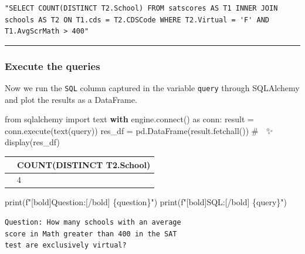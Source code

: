 \documentclass[
  letterpaper,
  DIV=11,
  numbers=noendperiod]{scrartcl}
\newenvironment{Shaded}{\begin{snugshade}}{\end{snugshade}}
\newcommand{\BuiltInTok}[1]{\textcolor[rgb]{0.00,0.23,0.31}{#1}}
\newcommand{\CommentTok}[1]{\textcolor[rgb]{0.37,0.37,0.37}{#1}}
\newcommand{\ControlFlowTok}[1]{\textcolor[rgb]{0.00,0.23,0.31}{\textbf{#1}}}
\newcommand{\ExtensionTok}[1]{\textcolor[rgb]{0.00,0.23,0.31}{#1}}
\newcommand{\ImportTok}[1]{\textcolor[rgb]{0.00,0.46,0.62}{#1}}
\newcommand{\NormalTok}[1]{\textcolor[rgb]{0.00,0.23,0.31}{#1}}
\newcommand{\OperatorTok}[1]{\textcolor[rgb]{0.37,0.37,0.37}{#1}}
\newcommand{\SpecialCharTok}[1]{\textcolor[rgb]{0.37,0.37,0.37}{#1}}
\newcommand{\SpecialStringTok}[1]{\textcolor[rgb]{0.13,0.47,0.30}{#1}}
\begin{document}
\begin{verbatim}
"SELECT COUNT(DISTINCT T2.School) FROM satscores AS T1 INNER JOIN schools AS T2 ON T1.cds = T2.CDSCode WHERE T2.Virtual = 'F' AND T1.AvgScrMath > 400"
\end{verbatim}

\begin{center}\rule{0.5\linewidth}{0.5pt}\end{center}

\subsubsection{Execute the queries}\label{execute-the-queries}

Now we run the \texttt{SQL} column captured in the variable
\texttt{query} through SQLAlchemy and plot the results as a DataFrame.

\begin{Shaded}
\begin{Highlighting}[]
\ImportTok{from}\NormalTok{ sqlalchemy }\ImportTok{import}\NormalTok{ text}
\ControlFlowTok{with}\NormalTok{ engine.}\ExtensionTok{connect}\NormalTok{() }\ImportTok{as}\NormalTok{ conn:}
\NormalTok{    result }\OperatorTok{=}\NormalTok{ conn.execute(text(query))}
\NormalTok{    res\_df }\OperatorTok{=}\NormalTok{ pd.DataFrame(result.fetchall()) }\CommentTok{\# 🐼 ✨}
\NormalTok{    display(res\_df)}
\end{Highlighting}
\end{Shaded}

\begin{longtable}[]{@{}ll@{}}
\toprule\noalign{}
& COUNT(DISTINCT T2.School) \\
\midrule\noalign{}
\endhead
\bottomrule\noalign{}
\endlastfoot
0 & 4 \\
\end{longtable}

\begin{Shaded}
\begin{Highlighting}[]
\BuiltInTok{print}\NormalTok{(}\SpecialStringTok{f"[bold]Question:[/bold] }\SpecialCharTok{\{}\NormalTok{question}\SpecialCharTok{\}}\SpecialStringTok{"}\NormalTok{)}
\BuiltInTok{print}\NormalTok{(}\SpecialStringTok{f"[bold]SQL:[/bold] }\SpecialCharTok{\{}\NormalTok{query}\SpecialCharTok{\}}\SpecialStringTok{"}\NormalTok{)}
\end{Highlighting}
\end{Shaded}

\begin{verbatim}
Question: How many schools with an average 
score in Math greater than 400 in the SAT 
test are exclusively virtual?
\end{verbatim}
\end{document}
